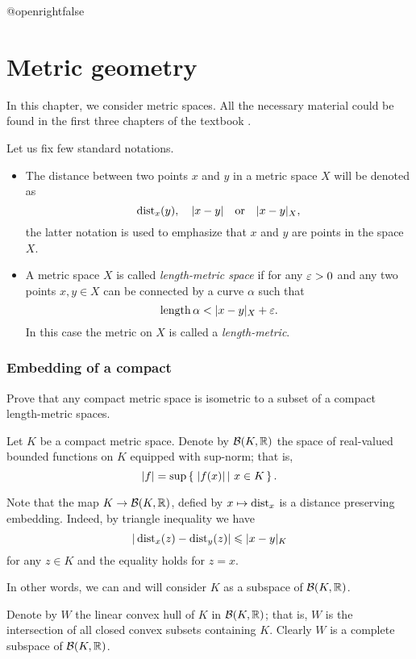 \csname @openrightfalse\endcsname
\chapter{Metric geometry}

In this chapter, we consider metric spaces.
All the necessary material could be found in the first three chapters of the textbook \cite{bbi}. 

Let us fix few standard notations.
\begin{itemize}
\item The distance between two points $x$ and $y$ in a metric space $X$
will be denoted as 
\[\operatorname{\rm dist}\nolimits_x(y),
\quad
|x-y|
\quad\text{or}\quad
|x-y|_X,
\]
the latter notation is used to emphasize that $x$ and $y$ are points in the space $X$.
\item A metric space $X$ is called {}\emph{length-metric space} if for any $\varepsilon>0$ and any two points $x,y\in X$ can be connected by a curve $\alpha$
such that
\[\length\alpha<|x-y|_X+\eps.\]
In this case the metric on $X$ is called a \emph{length-metric}.
\end{itemize}

\subsection*{Embedding of a compact}
\label{compact} 

\begin{pr}
Prove that any compact metric space 
is isometric to 
a subset of a compact length-metric spaces.
\end{pr}

Let $K$ be a compact metric space.
Denote by $\mathcal{B}(K,\mathbb{R})$ the space of real-valued bounded functions on $K$
equipped with sup-norm; 
that is, 
\[|f|=\sup\set{|f(x)|}{x\in K}.\]

Note that the map $K\to \mathcal{B}(K,\mathbb{R})$, defied by $x\mapsto \operatorname{\rm dist}\nolimits_x$
is a distance preserving embedding.
Indeed, by triangle inequality we have
\[|\operatorname{\rm dist}\nolimits_x(z)-\operatorname{\rm dist}\nolimits_y(z)|\leqslant |x-y|_K\]
for any $z\in K$
and the equality holds for $z=x$.

In other words, we can and will consider $K$ as a subspace of $\mathcal{B}(K,\mathbb{R})$.

Denote by $W$ the linear convex hull of $K$ in $\mathcal{B}(K,\mathbb{R})$;
that is, $W$ is the intersection of all closed convex subsets containing $K$. 
Clearly $W$ is a complete subspace of $\mathcal{B}(K,\mathbb{R})$.

